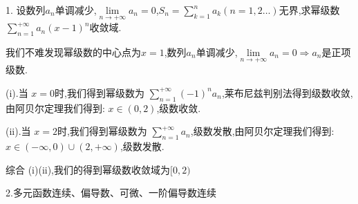 1. 设数列${a_{n}}$单调减少,$\lim\limits_{n\rightarrow +\infty}a_{n}=0$,$S_{n}=\sum\limits_{k=1}^{n}a_{k}(n=1,2\dots)$无界,求幂级数 $\sum\limits_{n=1}^{+\infty}a_{n}(x-1)^{n}$收敛域.
\begin{solution}
	
	我们不难发现幂级数的中心点为$x=1$,数列${a_{n}}$单调减少,$\lim\limits_{n\rightarrow +\infty}a_{n}=0\Rightarrow a_{n}$是正项级数.
	
	(i).当 $x=0$时,我们得到幂级数为 $\sum\limits_{n=1}^{+\infty}(-1)^na_{n}$,莱布尼兹判别法得到级数收敛,由阿贝尔定理我们得到: $x\in(0,2)$,级数收敛.
	
	(ii).当 $x=2$时,我们得到幂级数为 $\sum\limits_{n=1}^{+\infty}a_{n}$,级数发散,由阿贝尔定理我们得到: $x\in (-\infty,0) \cup (2,+\infty)$,级数发散.
	
	综合 (i)(ii),我们的得到幂级数收敛域为$[0,2)$
\end{solution}


2.多元函数连续、偏导数、可微、一阶偏导数连续

